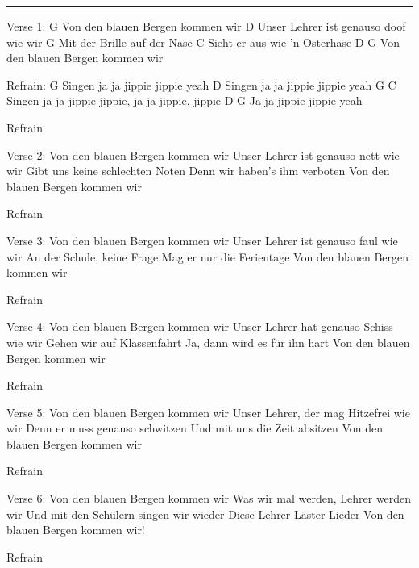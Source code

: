 \noindent\rule{\columnwidth}{1pt}

\begin{multicols}{2}
\begin{lstsong}
Verse 1:
        G
Von den blauen Bergen kommen wir
                                  D
Unser Lehrer ist genauso doof wie wir
        G
Mit der Brille auf der Nase
         C
Sieht er aus wie ’n Osterhase
        D                    G
Von den blauen Bergen kommen wir

Refrain:
       G
Singen ja ja jippie jippie yeah
                           D
Singen ja ja jippie jippie yeah
       G                    C
Singen ja ja jippie jippie, ja ja jippie, jippie
D                   G
Ja ja jippie jippie yeah

Refrain

Verse 2:
Von den blauen Bergen kommen wir
Unser Lehrer ist genauso nett wie wir
Gibt uns keine schlechten Noten
Denn wir haben’s ihm verboten
Von den blauen Bergen kommen wir

Refrain

Verse 3:
Von den blauen Bergen kommen wir
Unser Lehrer ist genauso faul wie wir
An der Schule, keine Frage
Mag er nur die Ferientage
Von den blauen Bergen kommen wir

Refrain
\end{lstsong}
\columnbreak
\begin{lstsong}
Verse 4:
Von den blauen Bergen kommen wir
Unser Lehrer hat genauso Schiss wie wir
Gehen wir auf Klassenfahrt
Ja, dann wird es für ihn hart
Von den blauen Bergen kommen wir

Refrain

Verse 5:
Von den blauen Bergen kommen wir
Unser Lehrer, der mag Hitzefrei wie wir
Denn er muss genauso schwitzen
Und mit uns die Zeit absitzen
Von den blauen Bergen kommen wir

Refrain

Verse 6:
Von den blauen Bergen kommen wir
Was wir mal werden, Lehrer werden wir
Und mit den Schülern singen wir wieder
Diese Lehrer-Läster-Lieder
Von den blauen Bergen kommen wir!

Refrain
\end{lstsong}
\end{multicols}
\newpage



